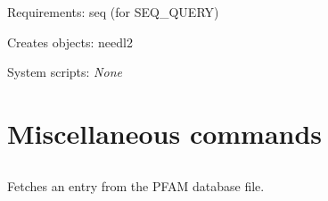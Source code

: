 \begin{description}
\begin{enumerate}
\end{enumerate}


\item{Requirements:} seq (for SEQ\_QUERY)


\item{Creates objects:} needl2


\item{System scripts:} {\em None}

\end{description}


\section{Miscellaneous commands}


\subsection[pfam\_fetch]{  }



Fetches an entry from the PFAM database file.


